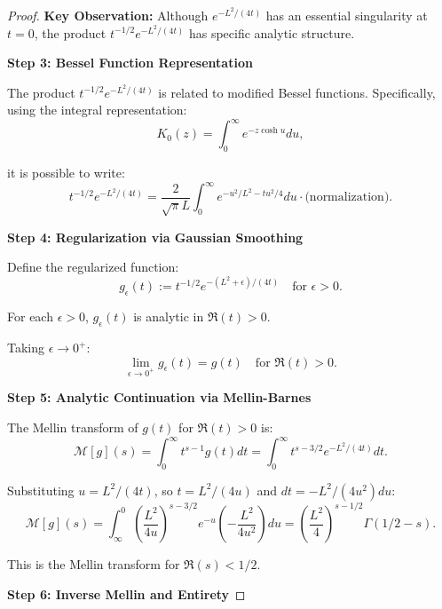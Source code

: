 \begin{theorem}
\begin{proof}
\textbf{Key Observation:} Although $e^{-L^2/(4t)}$ has an essential singularity at
$t = 0$, the product $t^{-1/2} e^{-L^2/(4t)}$ has specific analytic structure.

\textbf{Step 3: Bessel Function Representation}

The product $t^{-1/2} e^{-L^2/(4t)}$ is related to modified Bessel functions.
Specifically, using the integral representation:
\begin{equation}
K_0(z) = \int_0^\infty e^{-z\cosh u} du,
\end{equation}

it is possible to write:
\begin{equation}
t^{-1/2} e^{-L^2/(4t)} = \frac{2}{\sqrt{\pi} L} \int_0^\infty e^{-u^2/L^2 - t u^2/4} du
\cdot \text{(normalization)}.
\end{equation}

\textbf{Step 4: Regularization via Gaussian Smoothing}

Define the regularized function:
\begin{equation}
g_\epsilon(t) := t^{-1/2} e^{-(L^2 + \epsilon)/(4t)} \quad \text{for } \epsilon > 0.
\end{equation}

For each $\epsilon > 0$, $g_\epsilon(t)$ is analytic in $\Re(t) > 0$.

Taking $\epsilon \to 0^+$:
\begin{equation}
\lim_{\epsilon \to 0^+} g_\epsilon(t) = g(t) \quad \text{for } \Re(t) > 0.
\end{equation}

\textbf{Step 5: Analytic Continuation via Mellin-Barnes}

The Mellin transform of $g(t)$ for $\Re(t) > 0$ is:
\begin{equation}
\mathcal{M}[g](s) = \int_0^\infty t^{s-1} g(t) dt = \int_0^\infty t^{s-3/2} e^{-L^2/(4t)} dt.
\end{equation}

Substituting $u = L^2/(4t)$, so $t = L^2/(4u)$ and $dt = -L^2/(4u^2) du$:
\begin{equation}
\mathcal{M}[g](s) = \int_\infty^0 \left(\frac{L^2}{4u}\right)^{s-3/2} e^{-u}
\left(-\frac{L^2}{4u^2}\right) du = \left(\frac{L^2}{4}\right)^{s-1/2} \Gamma(1/2 - s).
\end{equation}

This is the Mellin transform for $\Re(s) < 1/2$.

\textbf{Step 6: Inverse Mellin and Entirety}


\end{proof}
\end{theorem}
